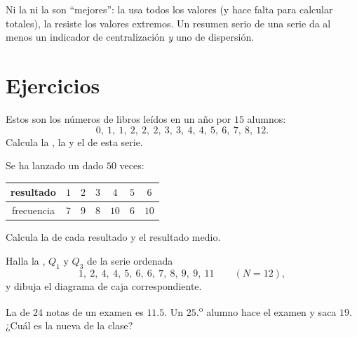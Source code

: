 \begin{remark}
Ni la  ni la  son ``mejores'': la  usa todos los valores
(y hace falta para calcular totales), la  resiste los valores
extremos. Un resumen serio de una serie da al menos un indicador de
centralización \emph{y} uno de dispersión.
\end{remark}

\section{Ejercicios}

\begin{exercise}[$\star$]\label{exo:g10:stats:1}
Estos son los números de libros leídos en un año por $15$ alumnos:
\[
0,\ 1,\ 1,\ 2,\ 2,\ 2,\ 3,\ 3,\ 4,\ 4,\ 5,\ 6,\ 7,\ 8,\ 12 .
\]
Calcula la , la  y el  de esta serie.
\end{exercise}

\begin{exercise}[$\star$]\label{exo:g10:stats:2}
Se ha lanzado un dado $50$ veces:
\begin{center}
\renewcommand{\arraystretch}{1.2}
\begin{tabular}{c|cccccc}
resultado & $1$ & $2$ & $3$ & $4$ & $5$ & $6$ \\
\hline
frecuencia & $7$ & $9$ & $8$ & $10$ & $6$ & $10$ \\
\end{tabular}
\end{center}
Calcula la  de cada resultado y el resultado medio.
\end{exercise}

\begin{exercise}[$\star$]\label{exo:g10:stats:3}
Halla la , $Q_1$ y $Q_3$ de la serie ordenada
\[
1,\ 2,\ 4,\ 4,\ 5,\ 6,\ 6,\ 7,\ 8,\ 9,\ 9,\ 11 \qquad (N = 12),
\]
y dibuja el diagrama de caja correspondiente.
\end{exercise}

\begin{exercise}[$\star$]\label{exo:g10:stats:4}
La  de $24$ notas de un examen es $11.5$. Un $25$.\textsuperscript{o}
alumno hace el examen y saca $19$. ¿Cuál es la nueva  de la clase?
\end{exercise}

